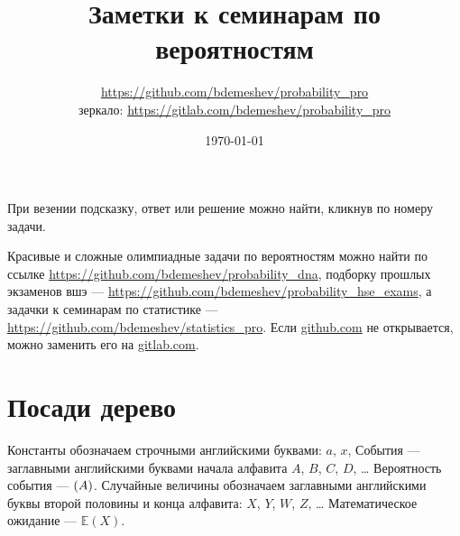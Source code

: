 \documentclass[12pt, a4paper]{article}
\title{Заметки к семинарам по вероятностям}
\author{\url{https://github.com/bdemeshev/probability_pro} \\
зеркало: \url{https://gitlab.com/bdemeshev/probability_pro}}
\date{\today}
\let\P\relax
\newcommand{\P}{\mathbb{P}}
\newcommand{\E}{\mathbb{E}}
\begin{document}
\maketitle %


\newpage
\tableofcontents{}

\newpage

При везении подсказку, ответ или решение можно найти, кликнув по номеру задачи. 

Красивые и сложные олимпиадные задачи по вероятностям можно найти по ссылке \url{https://github.com/bdemeshev/probability_dna},
подборку прошлых экзаменов вшэ — \url{https://github.com/bdemeshev/probability_hse_exams},
а задачки к семинарам по статистике — \url{https://github.com/bdemeshev/statistics_pro}.
Если \url{github.com} не открывается, можно заменить его на \url{gitlab.com}.


\section{Посади дерево}

\begin{leftbar}
Константы обозначаем строчными английскими буквами: $a$, $x$, События ­— заглавными английскими буквами начала алфавита $A$, $B$, $C$, $D$, \ldots{ } Вероятность события — $\P(A)$.
Случайные величины обозначаем заглавными английскими буквы второй половины и конца алфавита: $X$, $Y$, $W$, $Z$, \ldots{ } Математическое ожидание — $\E(X)$.
\end{leftbar}
\end{document}

